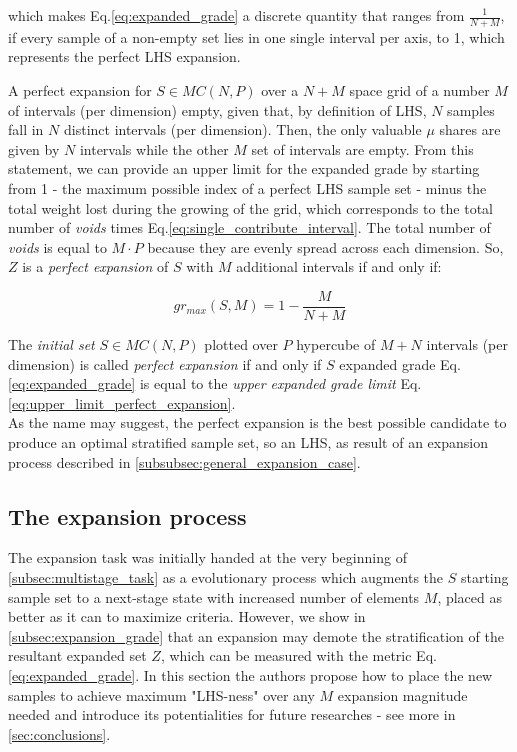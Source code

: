 \documentclass[12pt]{extarticle}
\newcommand{\meqref}[1]{Eq.\ref{#1}}
\begin{document}
which makes \meqref{eq:expanded_grade} a discrete quantity that ranges from $\frac{1}{N+M}$, if every sample of a non-empty set lies in one single interval per axis, to 1, which represents the perfect LHS expansion.

A perfect expansion for $S \in MC(N, P)$ over a $N+M$ space grid of a number $M$ of intervals (per dimension) empty, given that, by definition of LHS, $N$ samples fall in $N$ distinct intervals (per dimension). Then, the only valuable \textbf{$\mu$} shares are given by $N$ intervals while the other $M$ set of intervals are empty. From this statement, we can provide an upper limit for the expanded grade by starting from 1 - the maximum possible index of a perfect LHS sample set - minus the total weight lost during the growing of the grid, which corresponds to the total number of \textit{voids} times \meqref{eq:single_contribute_interval}. The total number of \textit{voids} is equal to $M \cdot P$ because they are evenly spread across each dimension. So, $Z$ is a \textit{perfect expansion} of $S$ with $M$ additional intervals if and only if:

\begin{equation}
\label{eq:upper_limit_perfect_expansion}
gr_{max}(S, M) = 1 - \frac{M}{N+M}
\end{equation}

The \textit{initial set} $S \in MC(N, P)$ plotted over $P$ hypercube of $M+N$ intervals (per dimension) is called \textit{perfect expansion} if and only if $S$ expanded grade \meqref{eq:expanded_grade} is equal to the \textit{upper expanded grade limit} \meqref{eq:upper_limit_perfect_expansion}. \\
As the name may suggest, the perfect expansion is the best possible candidate to produce an optimal stratified sample set, so an LHS, as result of an expansion process described in \cref{subsubsec:general_expansion_case}.


\subsection{The expansion process}
The expansion task was initially handed at the very beginning of  \cref{subsec:multistage_task} as a evolutionary process which augments the $S$ starting sample set to a next-stage state with increased number of elements $M$, placed as better as it can to maximize criteria. However, we show in \cref{subsec:expansion_grade} that an expansion may demote the stratification of the resultant expanded set $Z$, which can be measured with the metric \meqref{eq:expanded_grade}. 
In this section the authors propose how to place the new samples to achieve maximum "LHS-ness" over any $M$ expansion magnitude needed and introduce its potentialities for future researches - see more in \cref{sec:conclusions}.
\end{document}
